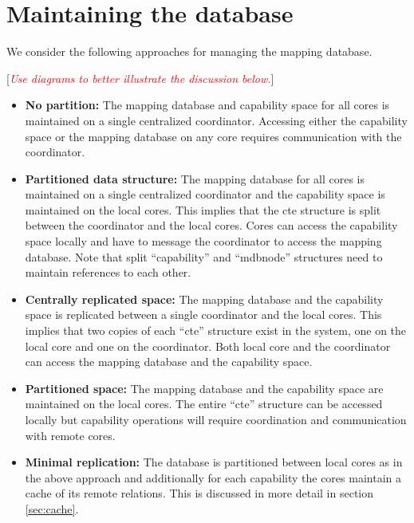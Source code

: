 \documentclass[a4paper,twoside]{report} %
\newcommand{\note}[1]{[\textcolor{red}{\textit{#1}}]}
\begin{document}

\chapter{Maintaining the database}\label{chap:db}
We consider the following approaches for managing the mapping
database.

\note{Use diagrams to better illustrate the discussion below.}

\begin{itemize}
\item \textbf{No partition:} The mapping database and capability space
  for all cores is maintained on a single centralized
  coordinator. Accessing either the capability space or the mapping
  database on any core requires communication with the coordinator.

\item \textbf{Partitioned data structure:} The mapping database for
  all cores is maintained on a single centralized coordinator and the
  capability space is maintained on the local cores. This implies that
  the cte structure is split between the coordinator and the local
  cores. Cores can access the capability space locally and have to
  message the coordinator to access the mapping database. Note that
  split ``capability'' and ``mdbnode'' structures need to maintain
  references to each other.

\item \textbf{Centrally replicated space:} The mapping database and
  the capability space is replicated between a single coordinator and
  the local cores. This implies that two copies of each ``cte''
  structure exist in the system, one on the local core and one on the
  coordinator. Both local core and the coordinator can access the
  mapping database and the capability space.

\item \textbf{Partitioned space:} The mapping database and the
  capability space are maintained on the local cores. The entire
  ``cte'' structure can be accessed locally but capability operations
  will require coordination and communication with remote cores.

\item \textbf{Minimal replication:} The database is partitioned
  between local cores as in the above approach and additionally for
  each capability the cores maintain a cache of its remote relations.
  This is discussed in more detail in section \ref{sec:cache}.
\end{itemize}
\end{document}
